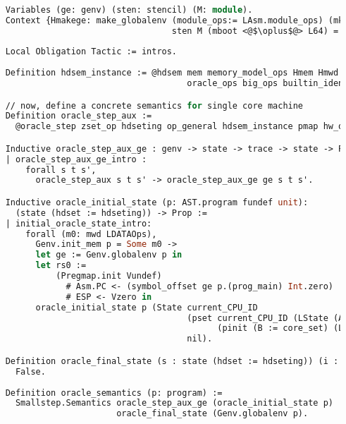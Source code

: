 \begin{lstlisting}[language=Caml]
   
    Variables (ge: genv) (sten: stencil) (M: module).
    Context {Hmakege: make_globalenv (module_ops:= LAsm.module_ops) (mkp_ops:= make_program_ops) 
                                     sten M (mboot <@$\oplus$@> L64) = ret ge}.
    
    Local Obligation Tactic := intros.
    
    Definition hdsem_instance := @hdsem mem memory_model_ops Hmem Hmwd real_params_ops oracle_ops0
                                        oracle_ops big_ops builtin_idents_norepet_prf ge sten M Hmakege.

    // now, define a concrete semantics for single core machine
    Definition oracle_step_aux :=
      @oracle_step zset_op hdseting op_general hdsem_instance pmap hw_oracle.

    Inductive oracle_step_aux_ge : genv -> state -> trace -> state -> Prop :=
    | oracle_step_aux_ge_intro : 
        forall s t s',
          oracle_step_aux s t s' -> oracle_step_aux_ge ge s t s'.

    Inductive oracle_initial_state (p: AST.program fundef unit): 
      (state (hdset := hdseting)) -> Prop := 
    | initial_oracle_state_intro: 
        forall (m0: mwd LDATAOps),
          Genv.init_mem p = Some m0 ->
          let ge := Genv.globalenv p in
          let rs0 :=
              (Pregmap.init Vundef)
                # Asm.PC <- (symbol_offset ge p.(prog_main) Int.zero)
                # ESP <- Vzero in
          oracle_initial_state p (State current_CPU_ID 
                                        (pset current_CPU_ID (LState (Asm.State rs0 m0) true)
                                              (pinit (B := core_set) (LState (Asm.State rs0 m0) false)))
                                        nil).

    Definition oracle_final_state (s : state (hdset := hdseting)) (i : int) : Prop :=
      False.
      
    Definition oracle_semantics (p: program) :=
      Smallstep.Semantics oracle_step_aux_ge (oracle_initial_state p) 
                          oracle_final_state (Genv.globalenv p). 
\end{lstlisting}



